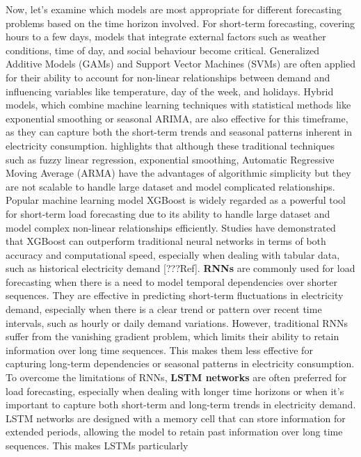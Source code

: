 \documentclass[mstat,12pt]{unswthesis}
\begin{document}
Now, let's examine which models are most appropriate for different
forecasting problems based on the time horizon involved. For short-term
forecasting, covering hours to a few days, models that integrate
external factors such as weather conditions, time of day, and social
behaviour become critical. Generalized Additive Models (GAMs) and
Support Vector Machines (SVMs) are often applied for their ability to
account for non-linear relationships between demand and influencing
variables like temperature, day of the week, and holidays. Hybrid
models, which combine machine learning techniques with statistical
methods like exponential smoothing or seasonal ARIMA, are also effective
for this timeframe, as they can capture both the short-term trends and
seasonal patterns inherent in electricity
consumption.\newline \cite{Wang2021} highlights that although these
traditional techniques such as fuzzy linear regression, exponential
smoothing, Automatic Regressive Moving Average (ARMA) have the
advantages of algorithmic simplicity but they are not scalable to handle
large dataset and model complicated relationships. Popular machine
learning model XGBoost is widely regarded as a powerful tool for
short-term load forecasting due to its ability to handle large dataset
and model complex non-linear relationships efficiently. Studies have
demonstrated that XGBoost can outperform traditional neural networks in
terms of both accuracy and computational speed, especially when dealing
with tabular data, such as historical electricity demand {[}???Ref{]}.
\textbf{RNNs} are commonly used for load forecasting when there is a
need to model temporal dependencies over shorter sequences. They are
effective in predicting short-term fluctuations in electricity demand,
especially when there is a clear trend or pattern over recent time
intervals, such as hourly or daily demand variations. However,
traditional RNNs suffer from the vanishing gradient problem, which
limits their ability to retain information over long time sequences.
This makes them less effective for capturing long-term dependencies or
seasonal patterns in electricity consumption. To overcome the
limitations of RNNs, \textbf{LSTM networks} are often preferred for load
forecasting, especially when dealing with longer time horizons or when
it's important to capture both short-term and long-term trends in
electricity demand. LSTM networks are designed with a memory cell that
can store information for extended periods, allowing the model to retain
past information over long time sequences. This makes LSTMs particularly
\end{document}
